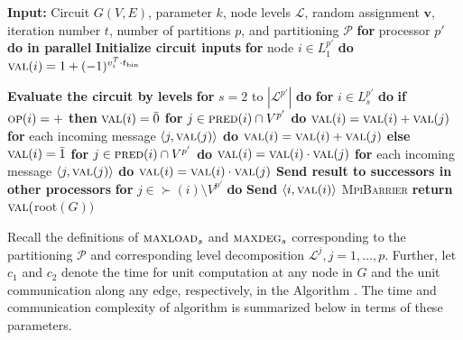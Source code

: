 \begin{algorithm}{}
\small
\caption{}
\label{alg:parEvaluate} 
\begin{algorithmic}[1]
\STATE \textbf{Input:} Circuit $G(V, E)$, parameter $k$, node levels $\mathcal{L}$, 
random assignment $\mathbf{v}$, iteration number $t$, number of partitions $p$, and
partitioning $\mathcal{P}$
\STATE
\STATE \textbf{for} processor $p'$ \textbf{do in parallel}
\STATE \quad \textbf{Initialize circuit inputs}
\STATE \quad \textbf{for} node $i \in L^{p'}_{1}$ \textbf{do}
\STATE \qquad $ \textsc{val}(i) = 1 + (-1)^{v_i^T \cdot t_{\text{bin}}}$

\STATE \quad \textbf{Evaluate the circuit by levels}
\STATE \quad \textbf{for} $s=2$ to $|\mathcal{L}^{p'}|$ \textbf{do}
\STATE \qquad \textbf{for} $i \in L_s^{p'}$ \textbf{do}
\STATE \qquad \quad \textbf{if} $\textsc{op}(i) = +$ \textbf{then}
\STATE \qquad \qquad $\textsc{val}(i) = \bar 0$
\STATE \qquad \qquad \textbf{for} $j \in \textsc{pred}(i)\cap V^{p'}$ \textbf{do}
\STATE \qquad \qquad \quad $\textsc{val}(i) = \textsc{val}(i) + \textsc{val}(j)$
\STATE \qquad \qquad \textbf{for} each incoming message $\langle j, \textsc{val}(j)\rangle$ \textbf{do}
\STATE \qquad \qquad \quad $\textsc{val}(i) = \textsc{val}(i) + \textsc{val}(j)$
\STATE \qquad \quad \textbf{else} 
\STATE \qquad \qquad $\textsc{val}(i) = \bar 1$
\STATE \qquad \qquad \textbf{for} $j \in \textsc{pred}(i)\cap V^{p'}$ \textbf{do}
\STATE \qquad \qquad \quad $\textsc{val}(i) = \textsc{val}(i) \cdot \textsc{val}(j)$
\STATE \qquad \qquad \textbf{for} each incoming message $\langle j, \textsc{val}(j)\rangle$ \textbf{do}
\STATE \qquad \qquad \quad $\textsc{val}(i) = \textsc{val}(i) \cdot \textsc{val}(j)$
\STATE \qquad \quad  \textbf{Send result to successors in other processors}
\STATE \qquad \quad \textbf{for} $j \in \succ(i) \setminus V^{p'}$ \textbf{do}
\STATE \qquad \qquad \textbf{Send} $\langle i, \textsc{val}(i)\rangle$
\STATE \textsc{MpiBarrier}
\STATE \textbf{return} $\textsc{val}($root$(G))$
\end{algorithmic}
\end{algorithm}

Recall the definitions of $\textsc{maxload}{}_s$ and $\textsc{maxdeg}{}_s$ corresponding to the partitioning
$\mathcal{P}$ and corresponding level decomposition $\mathcal{L}^j, j=1,\ldots,p$.
Further, let $c_1$ and $c_2$ denote the time for unit computation at any node in $G$
and the unit communication along any edge, respectively, in the Algorithm \parcircuit{}.
The time and communication complexity of algorithm \parmaxwt{} is summarized below
in terms of these parameters.

